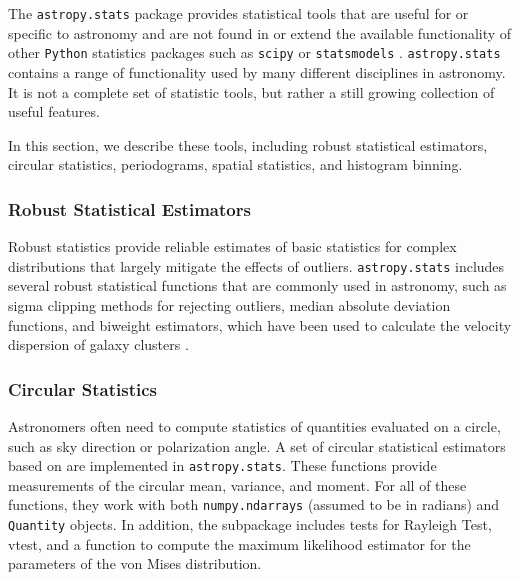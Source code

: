 \documentclass[modern]{aastex61}
\newcommand{\package}[1]{\texttt{#1}\xspace}
\newcommand{\python}{\package{Python}}
\begin{document}
The \package{astropy.stats} package provides statistical tools that
are useful for or specific to astronomy and are not found in or extend
the available functionality of other \python statistics packages such
as \package{scipy} \citep{scipy} or \package{statsmodels}
\citep{seabold2010statsmodels}.  \package{astropy.stats} contains
a range of functionality used by many different disciplines
in astronomy. It is not a complete set of statistic tools, but rather
a still growing collection of useful features.


In this section, we describe these tools, including robust statistical estimators, circular statistics, periodograms, spatial statistics, and histogram binning.



\subsubsection{Robust Statistical Estimators}

Robust statistics provide reliable estimates of basic statistics for complex distributions that largely mitigate the effects of outliers. \package{astropy.stats} includes several robust statistical functions that are commonly used in astronomy, such as sigma clipping methods for rejecting outliers, median absolute deviation functions, and biweight estimators, which have been used to calculate the velocity dispersion of galaxy clusters \citep{Beers1990}.

\subsubsection{Circular Statistics}

Astronomers often need to compute statistics of quantities evaluated on a circle, such as sky direction or polarization angle.
A set of circular statistical estimators based on \citet{JammalamadakaSengupta}
are implemented in \package{astropy.stats}.  These functions provide
measurements of the circular mean, variance, and moment.   For all of these
functions, they work with both \texttt{numpy.ndarrays} (assumed to be in
radians) and \texttt{Quantity} objects.  In addition, the subpackage includes
tests for Rayleigh Test, vtest, and a function to compute the maximum likelihood
estimator for the parameters of the von Mises distribution.
\end{document}
